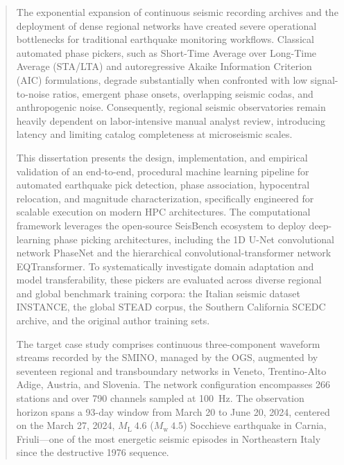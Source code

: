 
\begin{abstract}
The exponential expansion of continuous seismic recording archives and the deployment of dense regional networks have created severe operational bottlenecks for traditional earthquake monitoring workflows. Classical automated phase pickers, such as Short-Time Average over Long-Time Average (\ac{STA/LTA}) and autoregressive Akaike Information Criterion (\ac{AIC}) formulations, degrade substantially when confronted with low signal-to-noise ratios, emergent phase onsets, overlapping seismic codas, and anthropogenic noise. Consequently, regional seismic observatories remain heavily dependent on labor-intensive manual analyst review, introducing latency and limiting catalog completeness at microseismic scales.

This dissertation presents the design, implementation, and empirical validation of an end-to-end, procedural machine learning pipeline for automated earthquake pick detection, phase association, hypocentral relocation, and magnitude characterization, specifically engineered for scalable execution on modern \ac{HPC} architectures. The computational framework leverages the open-source SeisBench ecosystem to deploy deep-learning phase picking architectures, including the 1D U-Net convolutional network PhaseNet and the hierarchical convolutional-transformer network \ac{EQTransformer}. To systematically investigate domain adaptation and model transferability, these pickers are evaluated across diverse regional and global benchmark training corpora: the Italian seismic dataset \ac{INSTANCE}, the global \ac{STEAD} corpus, the Southern California \ac{SCEDC} archive, and the original author training sets.

The target case study comprises continuous three-component waveform streams recorded by the \acf{SMINO}, managed by the \acf{OGS}, augmented by seventeen regional and transboundary networks in Veneto, Trentino-Alto Adige, Austria, and Slovenia. The network configuration encompasses 266 stations and over 790 channels sampled at 100~Hz. The observation horizon spans a 93-day window from March 20 to June 20, 2024, centered on the March 27, 2024, $M_{\mathrm{L}}~4.6$ ($M_{\mathrm{w}}~4.5$) Socchieve earthquake in Carnia, Friuli—one of the most energetic seismic episodes in Northeastern Italy since the destructive 1976 sequence.


\end{abstract}

